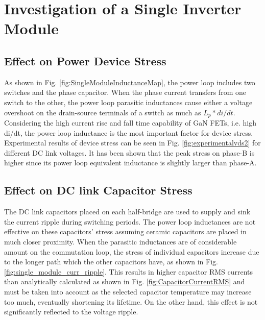 \section{Investigation of a Single Inverter Module}
\label{chap:curr_driven_rect}

\subsection{Effect on Power Device Stress}

As shown in Fig. \ref{fig:SingleModuleInductanceMap}, the power loop includes two switches and the phase capacitor. When the phase current transfers from one switch to the other, the power loop parasitic inductances cause either a voltage overshoot on the drain-source terminals of a switch as much as $L_p*di/dt$. Considering the high current rise and fall time capability of GaN FETs, i.e. high di/dt, the power loop inductance is the most important factor for device stress. Experimental results of device stress can be seen in Fig. \ref{fig:experimentalvds2} for different DC link voltages. It has been shown that the peak stress on phase-B is higher since its power loop equivalent inductance is slightly larger than phase-A.

\subsection{Effect on DC link Capacitor Stress}

The DC link capacitors placed on each half-bridge are used to supply and sink the current ripple during switching periods. The power loop inductances are not effective on these capacitors' stress assuming ceramic capacitors are placed in much closer proximity.
When the parasitic inductances are of considerable amount on the commutation loop, the stress of individual capacitors increase due to the longer path which the other capacitors have, as shown in Fig. \ref{fig:single_module_curr_ripple}. This results in higher capacitor RMS currents than analytically calculated \cite{Ugur2017} as shown in Fig. \ref{fig:CapacitorCurrentRMS} and must be taken into account as the selected capacitor temperature may increase too much, eventually shortening its lifetime. On the other hand, this effect is not significantly reflected to the voltage ripple.

